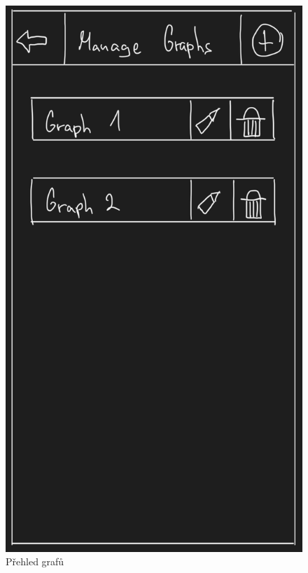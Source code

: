 \documentclass[12pt, titlepage]{article}
\begin{document}
\begin{figure}[ht]
	\centering
	\includegraphics[scale=0.43]{manage_graphs}
	\caption{Přehled grafů}
	\label{fig:manage_graphs}
\end{figure}
\end{document}
